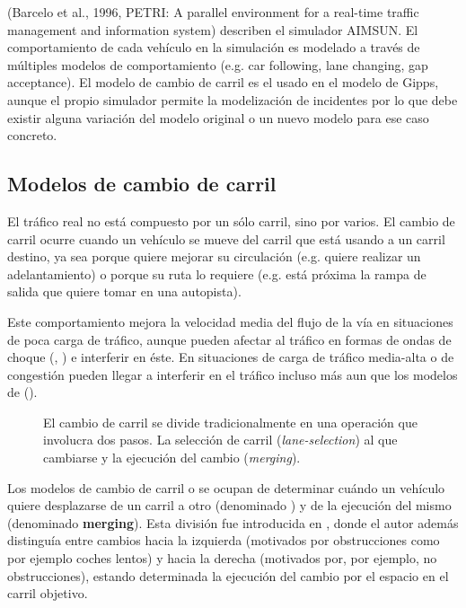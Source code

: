 (Barcelo et al., 1996, PETRI: A parallel environment for a real-time traffic management and information system) describen el simulador AIMSUN. El comportamiento de cada vehículo en la simulación es modelado a través de múltiples modelos de comportamiento (e.g. car following, lane changing, gap acceptance). El modelo de cambio de carril es el usado en el modelo de Gipps, aunque el propio simulador permite la modelización de incidentes por lo que debe existir alguna variación del modelo original o un nuevo modelo para ese caso concreto.

\subsection{Modelos de cambio de carril}

El tráfico real no está compuesto por un sólo carril, sino por varios. El cambio de carril ocurre cuando un vehículo se mueve del carril que está usando a un carril destino, ya sea porque quiere mejorar su circulación (e.g. quiere realizar un adelantamiento) o porque su ruta lo requiere (e.g. está próxima la rampa de salida que quiere tomar en una autopista).

Este comportamiento mejora la velocidad media del flujo de la vía en situaciones de poca carga de tráfico, aunque pueden afectar al tráfico en formas de ondas de choque (\cite{Sasoh2002}, \cite{Jin2006}) e interferir en éste. En situaciones de carga de tráfico media-alta o de congestión pueden llegar a interferir en el tráfico incluso más aun que los modelos de \textit{} (\cite{Laval2006}).

\begin{figure}
	\caption{El cambio de carril se divide tradicionalmente en una operación que involucra dos pasos. La selección de carril (\textit{lane-selection}) al que cambiarse y la ejecución del cambio (\textit{merging}).}
	\label{fig:lane-selection-plus-merging}
\end{figure}

Los modelos de cambio de carril o \textit{} se ocupan de determinar cuándo un vehículo quiere desplazarse de un carril a otro (denominado \textbf{}) y de la ejecución del mismo (denominado \textbf{merging}). Esta división fue introducida en \cite{Sparmann1978}, donde el autor además distinguía entre cambios hacia la izquierda (motivados por obstrucciones como por ejemplo coches lentos) y hacia la derecha (motivados por, por ejemplo, no obstrucciones), estando determinada la ejecución del cambio por el espacio en el carril objetivo.

